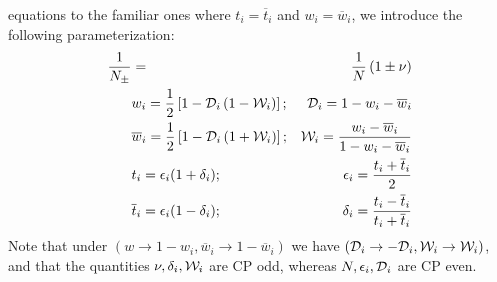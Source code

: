 \documentclass[a4paper,9pt,twoside]{article}
\begin{document}
equations to the familiar ones where $t_i=\overline{t}_i$ and $w_i=\overline{w}_i$, we introduce 
the following parameterization:
\begin{eqnarray}
\frac{1}{N_\pm} &=& \frac{1}{N}\left( 1 \pm \nu \right) \\
&w_i            = \frac{1}{2}\left[1-{\cal D}_i\left(1-{\cal W}_i\right) \right]; &  {\cal D}_i =1-w_i - \overline{w}_i \\
&\overline{w}_i = \frac{1}{2}\left[1-{\cal D}_i\left(1+{\cal W}_i\right) \right]; &  {\cal W}_i = \frac{ w_i - \overline{w}_i}{1-w_i-\overline{w}_i}\\
&t_i            = \epsilon_i(1+\delta_i);                              &  \epsilon_i = \frac{t_i + \overline{t}_i}{2}\\
&\overline{t}_i = \epsilon_i(1-\delta_i);                              &  \delta_i = \frac{t_i - \overline{t}_i}{t_i+\overline{t}_i}
\end{eqnarray}
Note that under $(w\rightarrow 1-w_i, \overline{w}_i\rightarrow 1-\overline{w}_i)$ we have $({\cal D}_i \rightarrow -{\cal D}_i,{\cal W}_i\rightarrow{\cal W}_i)$,
and that the quantities $\nu,\delta_i,{\cal W}_i$ are CP odd, whereas $N,\epsilon_i,{\cal D}_i$ are CP even.
\end{document}
